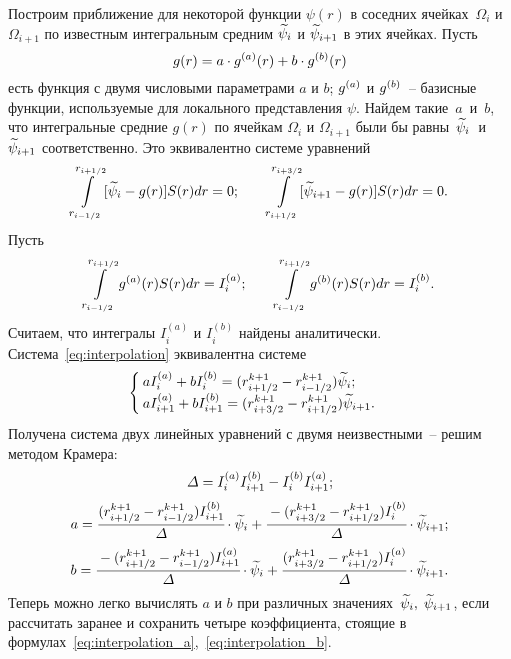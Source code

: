 Построим приближение для некоторой функции $\psi(r)$ в соседних ячейках~$\Omega_i$ и $\Omega_{i + 1}$ по известным интегральным средним ${\widetilde{\psi}}_i$ и ${\widetilde{\psi}}_{i + 1}$ в этих ячейках. Пусть
$$g(r) = a \cdot {g^{(a)}}(r) + b \cdot {g^{(b)}} (r)$$
есть функция с двумя числовыми параметрами $a$ и $b$; ${g^{(a)}}$ и ${g^{(b)}}$~-- базисные функции, используемые для локального представления $\psi$. Найдем такие~$a$~и~$b$, что интегральные средние $g(r)$ по ячейкам $\Omega_i$ и $\Omega_{i + 1}$ были бы равны~${\widetilde{\psi}}_i$~и~${\widetilde{\psi}}_{i + 1}$ соответственно. Это эквивалентно системе уравнений
\begin{equation}
	\int\limits_{r_{i - 1/2}}^{r_{i + 1/2}} [{\widetilde{\psi}}_i - g(r)] S(r) dr = 0 {\text{;}} \qquad \int\limits_{r_{i + 1/2}}^{r_{i + 3/2}} [{\widetilde{\psi}}_{i + 1} - g(r)] S(r) dr = 0 {\text{.}}
	\label{eq:interpolation}
\end{equation}
Пусть
$$\int\limits_{r_{i - 1/2}}^{r_{i + 1/2}} {g^{(a)}}(r) S(r) dr = I_i^{(a)}; \qquad \int\limits_{r_{i - 1/2}}^{r_{i + 1/2}} {g^{(b)}}(r) S(r) dr = I_i^{(b)} {\text{.}}$$
Считаем, что интегралы $I_i^{(a)}$ и $I_i^{(b)}$ найдены аналитически. Система~\eqref{eq:interpolation} эквивалентна системе
$$\begin{cases}
	a I_i^{(a)} + b I_i^{(b)} = (r_{i + 1/2}^{k + 1} - r_{i - 1/2}^{k + 1}) {\widetilde{\psi}}_i {\text{;}} \\
	a I_{i + 1}^{(a)} + b I_{i + 1}^{(b)} = (r_{i + 3/2}^{k + 1} - r_{i + 1/2}^{k + 1}) {\widetilde{\psi}}_{i + 1} {\text{.}}
\end{cases}$$
Получена система двух линейных уравнений с двумя неизвестными~-- решим методом Крамера:
$$\varDelta = I_i^{(a)} I_{i + 1}^{(b)} - I_i^{(b)} I_{i + 1}^{(a)} {\text{;}}$$
\begin{equation}
	a = \cfrac{(r_{i + 1/2}^{k + 1} - r_{i - 1/2}^{k + 1}) I_{i + 1}^{(b)}}{\varDelta} \cdot {\widetilde{\psi}}_i + \cfrac{-(r_{i + 3/2}^{k + 1} - r_{i + 1/2}^{k + 1}) I_i^{(b)}}{\varDelta} \cdot {\widetilde{\psi}}_{i + 1} {\text{;}}
	\label{eq:interpolation_a}
\end{equation}
\begin{equation}
	b = \cfrac{-(r_{i + 1/2}^{k + 1} - r_{i - 1/2}^{k + 1}) I_{i + 1}^{(a)}}{\varDelta} \cdot {\widetilde{\psi}}_i + \cfrac{(r_{i + 3/2}^{k + 1} - r_{i + 1/2}^{k + 1}) I_i^{(a)}}{\varDelta} \cdot {\widetilde{\psi}}_{i + 1} {\text{.}}
	\label{eq:interpolation_b}
\end{equation}
Теперь можно легко вычислять $a$ и $b$ при различных значениях~${\widetilde{\psi}}_i, \; {\widetilde{\psi}}_{i + 1}$, если рассчитать заранее и сохранить четыре коэффициента, стоящие в формулах~\eqref{eq:interpolation_a},~\eqref{eq:interpolation_b}. 

